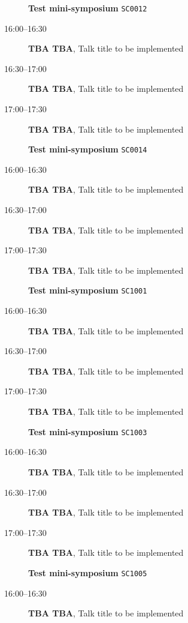 \documentclass[ILAS2025-program.tex]{subfiles}
\begin{document}
\begin{description}
\begin{description}
        \end{description}
    \begin{description}
    \item[] \textbf{Test mini-symposium} {\footnotesize\texttt{SC0012}}
    \item[16:00--16:30] \textbf{TBA TBA}, Talk title to be implemented
        \item[16:30--17:00] \textbf{TBA TBA}, Talk title to be implemented
        \item[17:00--17:30] \textbf{TBA TBA}, Talk title to be implemented
        \end{description}
    \begin{description}
    \item[] \textbf{Test mini-symposium} {\footnotesize\texttt{SC0014}}
    \item[16:00--16:30] \textbf{TBA TBA}, Talk title to be implemented
        \item[16:30--17:00] \textbf{TBA TBA}, Talk title to be implemented
        \item[17:00--17:30] \textbf{TBA TBA}, Talk title to be implemented
        \end{description}
    \begin{description}
    \item[] \textbf{Test mini-symposium} {\footnotesize\texttt{SC1001}}
    \item[16:00--16:30] \textbf{TBA TBA}, Talk title to be implemented
        \item[16:30--17:00] \textbf{TBA TBA}, Talk title to be implemented
        \item[17:00--17:30] \textbf{TBA TBA}, Talk title to be implemented
        \end{description}
    \begin{description}
    \item[] \textbf{Test mini-symposium} {\footnotesize\texttt{SC1003}}
    \item[16:00--16:30] \textbf{TBA TBA}, Talk title to be implemented
        \item[16:30--17:00] \textbf{TBA TBA}, Talk title to be implemented
        \item[17:00--17:30] \textbf{TBA TBA}, Talk title to be implemented
        \end{description}
    \begin{description}
    \item[] \textbf{Test mini-symposium} {\footnotesize\texttt{SC1005}}
    \item[16:00--16:30] \textbf{TBA TBA}, Talk title to be implemented

\end{description}
\end{description}
\end{document}
